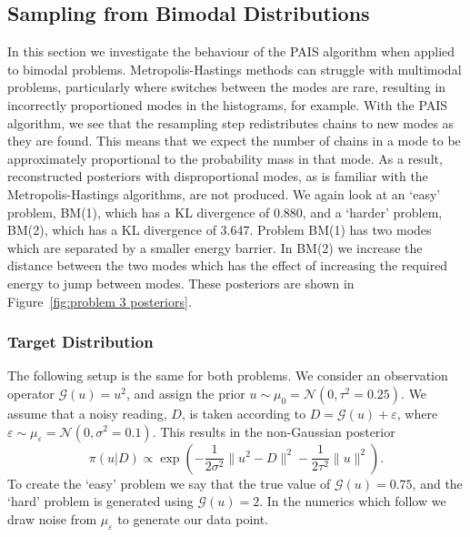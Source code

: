 \documentclass[final]{siamltex}
\newcommand{\G}{\mathcal{G}}
\newcommand{\N}{\mathcal{N}}
\begin{document}
\subsection{Sampling from Bimodal Distributions}

In this section we investigate the behaviour of the PAIS algorithm
when applied to bimodal problems. Metropolis-Hastings methods can
struggle with multimodal problems, particularly where switches between
the modes are rare, resulting in incorrectly proportioned modes in the
histograms, for example. With the PAIS algorithm, we see that the
resampling step redistributes chains to new modes as they are
found. This means that we expect the number of chains in a mode to be
approximately proportional to the probability mass in that mode. As a result, reconstructed posteriors with disproportional modes, as is familiar with the Metropolis-Hastings algorithms, are not produced. We again look at an `easy' problem, BM(1), which has a KL divergence of 0.880, and a `harder' problem, BM(2), which has a KL divergence of 3.647. Problem BM(1) has two modes which are separated by a smaller energy barrier. In BM(2) we increase the distance between the two modes which has the effect of increasing the required energy to jump between modes. These posteriors are shown in Figure~\ref{fig:problem 3 posteriors}.

\subsubsection{Target Distribution}

The following setup is the same for both problems. We consider an observation operator $\G(u) = u^2$, and assign the prior $u \sim \mu_0 = \N(0, \tau^2=0.25)$. We assume that a noisy reading, $D$, is taken according to $D = \G(u) + \varepsilon$, where $\varepsilon \sim \mu_\varepsilon = \N(0, \sigma^2 = 0.1)$. This results in the non-Gaussian posterior
\[
	\pi(u|D) \propto \exp\left(-\frac{1}{2\sigma^2}\|u^2 - D\|^2 - \frac{1}{2\tau^2}\|u\|^2\right).
\]
To create the `easy' problem we say that the true value of $\G(u) = 0.75$, and the `hard' problem is generated using $\G(u) = 2$. In the numerics which follow we draw noise from $\mu_\varepsilon$ to generate our data point.
\end{document}
